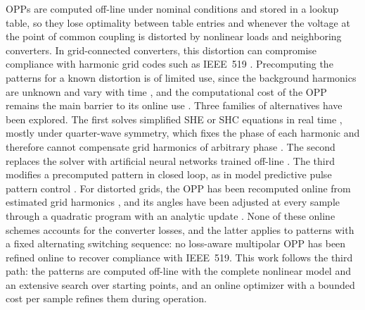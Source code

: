 \documentclass[conference]{IEEEtran}
\begin{document}
OPPs are computed off-line under nominal conditions and stored in a lookup
table, so they lose optimality between table entries and whenever the
voltage at the point of common coupling is distorted by nonlinear loads and
neighboring converters. In grid-connected converters, this distortion can
compromise compliance with harmonic grid codes such as IEEE~519
\cite{ieee519}. Precomputing the patterns for a known distortion
\cite{rahmanpour_distorted} is of limited use, since the background
harmonics are unknown and vary with time \cite{david_aggr}, and the
computational cost of the OPP remains the main barrier to its online use
\cite{zhang_hpm}. Three families of alternatives have been explored. The
first solves simplified SHE or SHC equations in real time
\cite{yang_rt,buccella_recursive}, mostly under quarter-wave symmetry, which
fixes the phase of each harmonic and therefore cannot compensate grid
harmonics of arbitrary phase \cite{tsekouras_tpel}. The second replaces the
solver with artificial neural networks trained off-line
\cite{filho_ann,ibanez_ann}. The third modifies a precomputed pattern in
closed loop, as in model predictive pulse pattern control
\cite{geyer_mp3c,dorfling_gp3c}. For distorted grids, the OPP has been
recomputed online from estimated grid harmonics \cite{tsekouras_ecce}, and
its angles have been adjusted at every sample through a quadratic program
with an analytic update \cite{tsekouras_tpel}. None of these online schemes
accounts for the converter losses, and the latter applies to patterns with a
fixed alternating switching sequence: no loss-aware multipolar OPP has been
refined online to recover compliance with IEEE~519. This work follows the
third path: the patterns are computed off-line with the complete nonlinear
model and an extensive search over starting points, and an online optimizer
with a bounded cost per sample refines them during operation.
\end{document}
